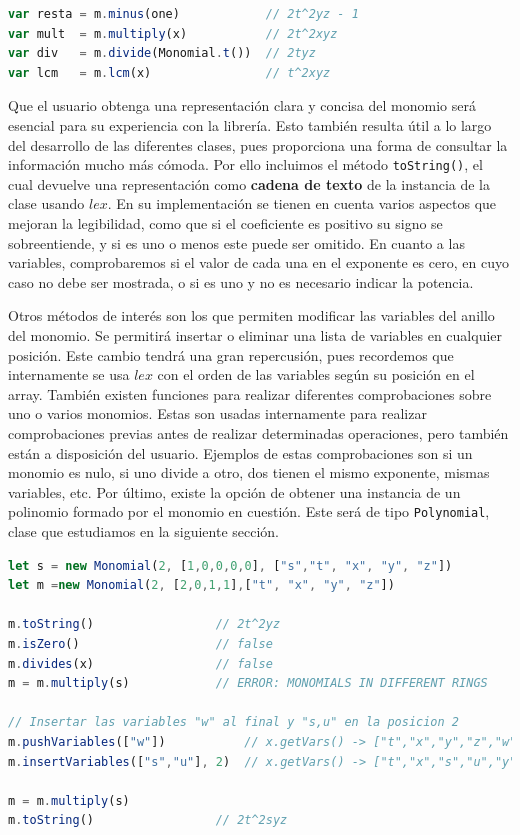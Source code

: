 \begin{lstlisting}[language=Javascript]
var resta = m.minus(one)            // 2t^2yz - 1
var mult  = m.multiply(x)           // 2t^2xyz
var div   = m.divide(Monomial.t())  // 2tyz
var lcm   = m.lcm(x)                // t^2xyz
\end{lstlisting}

Que el usuario obtenga una representación clara y concisa del monomio será esencial para su experiencia con la librería. Esto también resulta útil a lo largo del desarrollo de las diferentes clases, pues proporciona una forma de consultar la información mucho más cómoda. Por ello incluimos el método \texttt{toString()}, el cual devuelve una representación como \textbf{cadena de texto} de la instancia de la clase usando $lex$. En su implementación se tienen en cuenta varios aspectos que mejoran la legibilidad, como que si el coeficiente es positivo su signo se sobreentiende, y si es uno o menos este puede ser omitido. En cuanto a las variables, comprobaremos si el valor de cada una en el exponente es cero, en cuyo caso no debe ser mostrada, o si es uno y no es necesario indicar la potencia.\newline

Otros métodos de interés son los que permiten modificar las variables del anillo del monomio. Se permitirá insertar o eliminar una lista de variables en cualquier posición. Este cambio tendrá una gran repercusión, pues recordemos que internamente se usa $lex$ con el orden de las variables según su posición en el array. También existen funciones para realizar diferentes comprobaciones sobre uno o varios monomios. Estas son usadas internamente para realizar comprobaciones previas antes de realizar determinadas operaciones, pero también están a disposición del usuario. Ejemplos de estas comprobaciones son si un monomio es nulo, si uno divide a otro, dos tienen el mismo exponente, mismas variables, etc. Por último, existe la opción de obtener una instancia de un polinomio formado por el monomio en cuestión. Este será de tipo \texttt{Polynomial}, clase que estudiamos en la siguiente sección.
\begin{lstlisting}[language=Javascript]
let s = new Monomial(2, [1,0,0,0,0], ["s","t", "x", "y", "z"])
let m =new Monomial(2, [2,0,1,1],["t", "x", "y", "z"])

m.toString()                 // 2t^2yz
m.isZero()                   // false
m.divides(x)                 // false
m = m.multiply(s)            // ERROR: MONOMIALS IN DIFFERENT RINGS

// Insertar las variables "w" al final y "s,u" en la posicion 2
m.pushVariables(["w"])           // x.getVars() -> ["t","x","y","z","w"]
m.insertVariables(["s","u"], 2)  // x.getVars() -> ["t","x","s","u","y","z","w"]

m = m.multiply(s)
m.toString()                 // 2t^2syz
\end{lstlisting}

